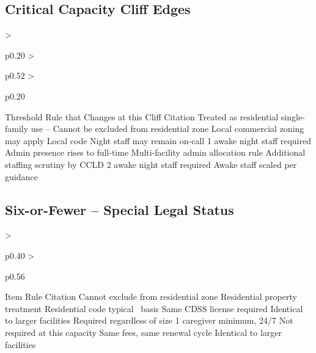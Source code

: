 \subsection{Critical Capacity Cliff Edges}
\begin{cheattablethree}
  {>{\raggedright\arraybackslash}p{0.20\linewidth}
   >{\raggedright\arraybackslash}p{0.52\linewidth}
   >{\raggedright\arraybackslash}p{0.20\linewidth}}
  {Threshold}
  {Rule that Changes at this Cliff}
  {Citation}
    {Treated as residential single-family use}
    {--}
    {Cannot be excluded from residential zone}
    {}
    {Local commercial zoning may apply}
    {Local code}
    {Night staff may remain on-call}
    {}
    {1 awake night staff required}
    {}
    {Admin presence rises to full-time}
    {}
    {Multi-facility admin allocation rule}
    {}
    {Additional staffing scrutiny by CCLD}
    {}
    {2 awake night staff required}
    {}
    {Awake staff scaled per guidance}
    {}
\end{cheattablethree}

\subsection{Six-or-Fewer -- Special Legal Status}
\begin{cheattable}
  {>{\raggedright\arraybackslash}p{0.40\linewidth}
   >{\raggedright\arraybackslash}p{0.56\linewidth}}
  {Item}
  {Rule \hfill Citation}
   {\zoningSmall \hfill {}}
   {Cannot exclude from residential zone \hfill {}}
   {Residential property treatment \hfill {}}
   {Residential code typical \hfill {}}
   {\fireSelfPres\ basis \hfill {}}
   {Same CDSS license required \hfill {}}
   {Identical to larger facilities \hfill {}}
   {Required regardless of size \hfill {}}
   {1 caregiver minimum, 24/7 \hfill {}}
   {Not required at this capacity \hfill {}}
   {Same fees, same renewal cycle \hfill {}}
   {Identical to larger facilities \hfill {}}
\end{cheattable}


